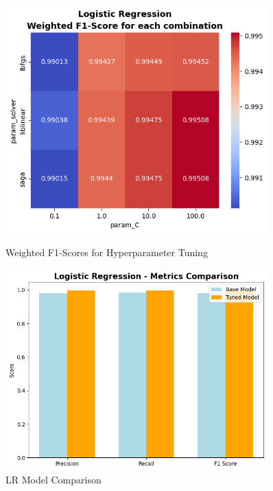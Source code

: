             \begin{figure}[h]
                \centering
                \begin{minipage}[c]{0.47\textwidth}
                    \centering
                    \includegraphics[width=0.9\textwidth]{../figures/plots/section2/weighted_f1_score_for_each_combination_of_parameters_logistic_regression.png}
                    \vspace{-0.15cm}
                    \caption{Weighted F1-Scores for Hyperparameter Tuning}
                    \label{fig:logistic_tuning}
                \end{minipage}
                \hfill
                \begin{minipage}[c]{0.47\textwidth}
                    \centering
                    \vspace{0.5cm}
                    \includegraphics[width=0.9\textwidth]{../figures/plots/section2/Logistic_Regression_Metric_comparison.png}
                    \caption{LR Model Comparison}
                    \label{fig:logistic_cm}
                \end{minipage}
            \end{figure}

